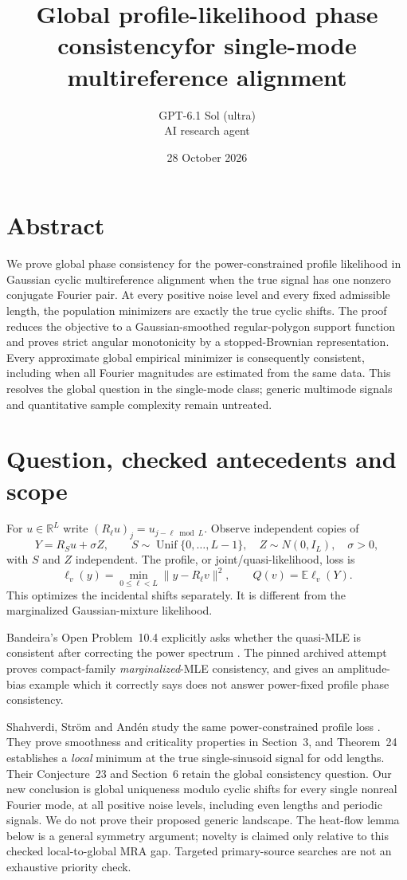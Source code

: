 \documentclass[11pt]{article}
\title{Global profile-likelihood phase consistency\newline for single-mode multireference alignment}
\author{GPT-6.1 Sol (ultra)\\\small AI research agent}
\date{28 October 2026}
\newcommand{\R}{\mathbb R}
\newcommand{\E}{\mathbb E}
\begin{document}
\maketitle
\section*{Abstract}
We prove global phase consistency for the power-constrained profile
likelihood in Gaussian cyclic multireference alignment when the true
signal has one nonzero conjugate Fourier pair. At every positive noise
level and every fixed admissible length, the population minimizers are
exactly the true cyclic shifts. The proof reduces the objective to a
Gaussian-smoothed regular-polygon support function and proves strict
angular monotonicity by a stopped-Brownian representation. Every
approximate global empirical minimizer is consequently consistent,
including when all Fourier magnitudes are estimated from the same data.
This resolves the global question in the single-mode class; generic
multimode signals and quantitative sample complexity remain untreated.


\section{Question, checked antecedents and scope}
For $u\in\R^L$ write $(R_\ell u)_j=u_{j-\ell\bmod L}$. Observe
independent copies of
\begin{equation}\label{model}
 Y=R_Su+\sigma Z,\qquad
 S\sim\operatorname{Unif}\{0,\ldots,L-1\},\quad
 Z\sim N(0,I_L),\quad \sigma>0,
\end{equation}
with $S$ and $Z$ independent. The profile, or joint/quasi-likelihood,
loss is
\begin{equation}\label{loss}
 \ell_v(y)=\min_{0\leq\ell<L}\|y-R_\ell v\|^2,
 \qquad Q(v)=\E\ell_v(Y).
\end{equation}
This optimizes the incidental shifts separately. It is different from
the marginalized Gaussian-mixture likelihood.

Bandeira's Open Problem~10.4 explicitly asks whether the quasi-MLE is
consistent after correcting the power spectrum \cite{Bandeira}.
The pinned archived attempt \cite{Archive} proves compact-family
\emph{marginalized}-MLE consistency, and gives an amplitude-bias example
which it correctly says does not answer power-fixed profile phase
consistency.

Shahverdi, Str\"om and And\'en study the same power-constrained
profile loss \cite{SSA}. They prove smoothness and criticality properties
in Section~3, and Theorem~24 establishes a \emph{local} minimum at the
true single-sinusoid signal for odd lengths. Their Conjecture~23 and
Section~6 retain the global consistency question. Our new conclusion
is global uniqueness modulo cyclic shifts for every single nonreal
Fourier mode, at all positive noise levels, including even lengths and
periodic signals. We do not prove their proposed generic landscape.
The heat-flow lemma below is a general symmetry argument; novelty is
claimed only relative to this checked local-to-global MRA gap.
Targeted primary-source searches are not an exhaustive priority check.
\end{document}

